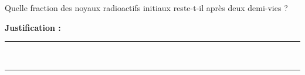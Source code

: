 Quelle fraction des noyaux radioactifs initiaux reste-t-il après deux demi-vies ?

\choices

\noindent\textbf{Justification :} \hrulefill \\[2.5ex]
\rule{\linewidth}{0.4pt} \\[2.5ex]
\rule{\linewidth}{0.4pt}
\vfill

